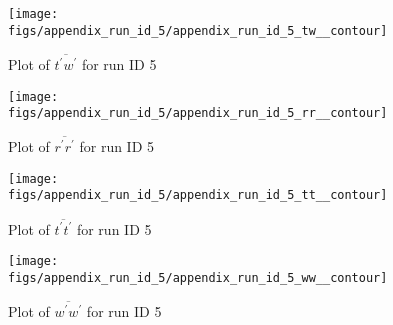 \begin{figure}[H]
\centering
\texttt{[image: figs/appendix\_run\_id\_5/appendix\_run\_id\_5\_tw\_\_contour]}
\caption{Plot of $\overline{t^\prime w^\prime}$ for run ID 5}
\label{fig:appendix_run_id_5_tw__contour}
\end{figure}


\begin{figure}[H]
\centering
\texttt{[image: figs/appendix\_run\_id\_5/appendix\_run\_id\_5\_rr\_\_contour]}
\caption{Plot of $\overline{r^\prime r^\prime}$ for run ID 5}
\label{fig:appendix_run_id_5_rr__contour}
\end{figure}


\begin{figure}[H]
\centering
\texttt{[image: figs/appendix\_run\_id\_5/appendix\_run\_id\_5\_tt\_\_contour]}
\caption{Plot of $\overline{t^\prime t^\prime}$ for run ID 5}
\label{fig:appendix_run_id_5_tt__contour}
\end{figure}


\begin{figure}[H]
\centering
\texttt{[image: figs/appendix\_run\_id\_5/appendix\_run\_id\_5\_ww\_\_contour]}
\caption{Plot of $\overline{w^\prime w^\prime}$ for run ID 5}
\label{fig:appendix_run_id_5_ww__contour}
\end{figure}


